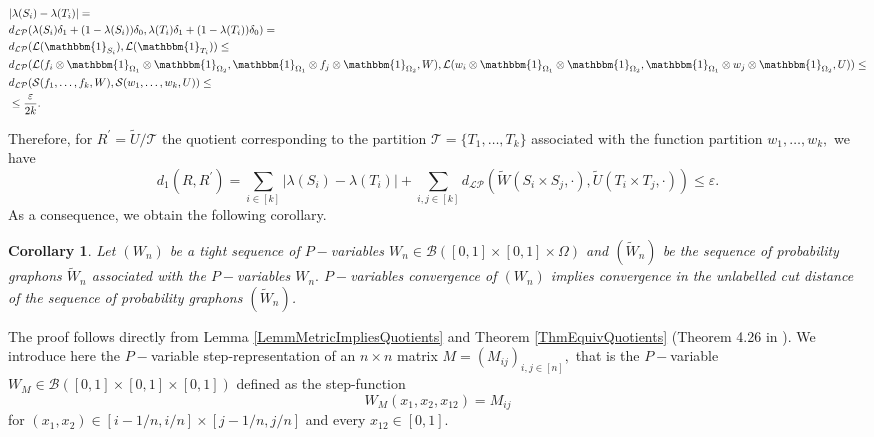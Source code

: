 \documentclass[11pt]{article}
\newtheorem{corollary}{Corollary}[theorem]
\newcommand{\cB}{{\mathcal B}}  %
\newcommand{\cL}{{\mathcal L}}  %
\newcommand{\cT}{{\mathcal T}}  %
\begin{document}
$$\begin{aligned}
    &|\lambda(S_i)-\lambda(T_i)|=\\
    &d_{\mathcal{LP}}(\lambda(S_i)\delta_1+(1-\lambda(S_i))\delta_0,\lambda(T_i)\delta_1+(1-\lambda(T_i))\delta_0)=\\
  &d_{\mathcal{LP}}(\cL(\mathbbm{1}_{S_i}),\cL(\mathbbm{1}_{T_i}))\leq  \\
  &d_{\mathcal{LP}}(\mathcal{L}(f_i \otimes\mathbbm{1}_{\Omega_1} \otimes \mathbbm{1}_{\Omega_2},\mathbbm{1}_{\Omega_1}\otimes f_j \otimes\mathbbm{1}_{\Omega_2},W),\mathcal{L}(w_i \otimes\mathbbm{1}_{\Omega_1} \otimes \mathbbm{1}_{\Omega_2},\mathbbm{1}_{\Omega_1}\otimes w_j \otimes\mathbbm{1}_{\Omega_2},U))\leq\\
  &d_{\mathcal{LP}}(\mathcal{S}(f_1,\ldots,f_k,W),\mathcal{S}(w_1,\ldots,w_k,U))\leq \\
  &  \leq \frac{\varepsilon}{2k}.
\end{aligned}$$

Therefore, for $R^{\prime}=\widetilde U/\cT$ the quotient corresponding to the partition $\cT=\{T_1,\ldots, T_k\}$ associated with the  function partition $w_1,\ldots, w_k,$ we have $$d_1(R,R^{\prime})=\sum_{i\in[k]}|\lambda(S_i)-\lambda(T_i)|+\sum_{i,j\in [k]} d_{\mathcal{LP}}\left(\widetilde W(S_i\times S_j,\cdot),\widetilde U(T_i\times T_j,\cdot)\right)\leq \varepsilon. $$
\endproof
As a consequence, we obtain the following corollary.
\begin{corollary}
\label{CorMetricImpliesUnlbCutDist}
Let $(W_n)$ be a tight sequence of $P-$variables $W_n\in \cB([0,1]\times [0,1]\times \Omega) $ and $(\widetilde W_n)$ be the sequence of probability graphons $\widetilde W_n$ associated with the $P-$variables $W_n.$  $P-$variables convergence of $(W_n)$ implies convergence in the unlabelled cut distance of the sequence of probability graphons $(\widetilde W_n)$. 
\end{corollary}
\proof
The proof follows directly from Lemma \ref{LemmMetricImpliesQuotients} and Theorem \ref{ThmEquivQuotients} (Theorem 4.26 in \cite{zucal2024probabilitygraphonsrightconvergence}).
\endproof
We introduce here the $P-$variable step-representation of an $n\times n$ matrix $M=(M_{ij})_{i,j\in[n]},$ that is the $P-$variable $W_M\in \cB([0,1]\times [0,1]\times [0,1])$ defined as the step-function
\begin{equation}\label{Eq:P-setStepMatrix}
    W_M(x_1,x_2,x_{12})=M_{ij} 
\end{equation}
for $(x_1,x_2)\in [i-1/n,i/n] \times [j-1/n,j/n]$ and every $x_{12}\in [0,1].$
\end{document}
